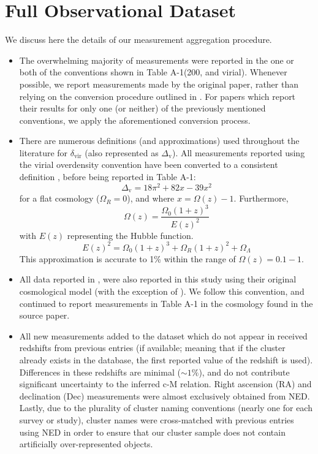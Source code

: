 \chapter{Full Observational Dataset}
We discuss here the details of our measurement aggregation procedure. 
\begin{itemize}
\item The overwhelming majority of measurements were reported in the one or
  both of the conventions shown in Table A-1\footnotemark[1] (200, and
  virial). Whenever possible, we report measurements made by the original
  paper, rather than relying on the conversion procedure outlined in
  \citet{HK03.1}. For papers which report their results for only one (or
  neither) of the previously mentioned conventions, we apply the aforementioned
  conversion process. 
\item There are numerous definitions (and approximations) used throughout the
  literature for $\delta_{\mathrm{vir}}$ (also represented as
  $\Delta_{\mathrm{v}}$). All measurements reported using the virial
  overdensity convention have been converted to a consistent definition
  \citep{BR98.1}, before being reported in Table A-1:
\begin{equation}
\Delta_{\mathrm{v}} = 18\pi^{2} + 82x - 39x^{2}
\end{equation}
for a flat cosmology ($\Omega_{R} = 0$), and where $x = \Omega (z) -
1$. Furthermore, 
\begin{equation}
\Omega (z) = \frac{\Omega_{0} \left( 1+z \right)^{3}}{E(z)^{2}}
\end{equation}
with $E(z)$ representing the Hubble function.
\begin{equation}
E(z)^{2} = \Omega_{0} \left( 1+z \right)^{3} + \Omega_{R} \left( 1+z \right)^{2} + \Omega_{\Lambda}
\end{equation}
This approximation is accurate to 1\% within the range of $\Omega (z) =
0.1-1$.
\item All data reported in \citet{CO07.1}, were also reported in this study
  using their original cosmological model (with the exception of
  \citet{KI02.1}). We follow this convention, and continued to report
  measurements in Table A-1 in the cosmology found in the source paper.
\item All new measurements added to the dataset which do not appear in \citet{CO07.1}
  received redshifts from previous entries (if available; meaning that if the
  cluster already exists in the database, the first reported value of the
  redshift is used). Differences in these redshifts are minimal ($\mathrm{\sim
    1\%}$), and do not contribute significant uncertainty to the inferred c-M
  relation. Right ascension (RA) and declination (Dec) measurements were almost
  exclusively obtained from NED\footnotemark[2]. Lastly, due to the plurality of cluster
  naming conventions (nearly one for each survey or study), cluster names were
  cross-matched with previous entries using NED in order to ensure that our
  cluster sample does not contain artificially over-represented objects.
\end{itemize}


